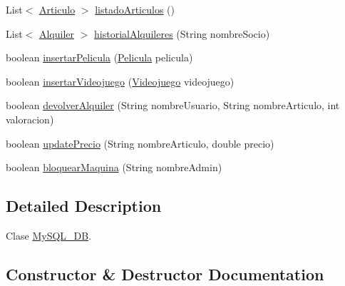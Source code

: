 \begin{DoxyCompactItemize}
\item 
List$<$ \mbox{\hyperlink{classes_1_1deusto_1_1client_1_1data_1_1_articulo}{Articulo}} $>$ \mbox{\hyperlink{classes_1_1deusto_1_1server_1_1db_1_1_my_s_q_l___d_b_a96de9a556e05d6e04a2cb4553674a3ff}{listado\+Articulos}} ()
\item 
List$<$ \mbox{\hyperlink{classes_1_1deusto_1_1client_1_1data_1_1_alquiler}{Alquiler}} $>$ \mbox{\hyperlink{classes_1_1deusto_1_1server_1_1db_1_1_my_s_q_l___d_b_a8759ef6481a9fbab8ee3cad5a99abbc9}{historial\+Alquileres}} (String nombre\+Socio)
\item 
boolean \mbox{\hyperlink{classes_1_1deusto_1_1server_1_1db_1_1_my_s_q_l___d_b_aa78bfb2d1799dcaafbe2d47ded3d137c}{insertar\+Pelicula}} (\mbox{\hyperlink{classes_1_1deusto_1_1client_1_1data_1_1_pelicula}{Pelicula}} pelicula)
\item 
boolean \mbox{\hyperlink{classes_1_1deusto_1_1server_1_1db_1_1_my_s_q_l___d_b_a2da5706482d7ada9b3b1479fc172f956}{insertar\+Videojuego}} (\mbox{\hyperlink{classes_1_1deusto_1_1client_1_1data_1_1_videojuego}{Videojuego}} videojuego)
\item 
boolean \mbox{\hyperlink{classes_1_1deusto_1_1server_1_1db_1_1_my_s_q_l___d_b_ab767d728176cb3c56ef6a7a3b787bff0}{devolver\+Alquiler}} (String nombre\+Usuario, String nombre\+Articulo, int valoracion)
\item 
boolean \mbox{\hyperlink{classes_1_1deusto_1_1server_1_1db_1_1_my_s_q_l___d_b_ab906a09145b0248413b7f17342f15bd2}{update\+Precio}} (String nombre\+Articulo, double precio)
\item 
boolean \mbox{\hyperlink{classes_1_1deusto_1_1server_1_1db_1_1_my_s_q_l___d_b_a55faf265407ccfeac4078b95991d6a2f}{bloquear\+Maquina}} (String nombre\+Admin)
\end{DoxyCompactItemize}


\subsection{Detailed Description}
Clase \mbox{\hyperlink{classes_1_1deusto_1_1server_1_1db_1_1_my_s_q_l___d_b}{My\+S\+Q\+L\+\_\+\+DB}}. 

\subsection{Constructor \& Destructor Documentation}
\mbox{\label{classes_1_1deusto_1_1server_1_1db_1_1_my_s_q_l___d_b_aea1d77cd2574a2c2457d231c8c7c2d56}} 
